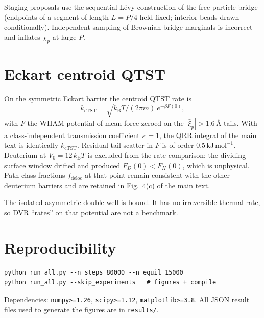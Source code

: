\documentclass[12pt]{article}
\newcommand{\chip}{\chi_p}
\begin{document}
Staging proposals use the sequential L\'evy construction of the free-particle bridge (endpoints of a segment of length $L=P/4$ held fixed; interior beads drawn conditionally). Independent sampling of Brownian-bridge marginals is incorrect and inflates $\chip$ at large $P$.

\section{Eckart centroid QTST}

On the symmetric Eckart barrier the centroid QTST rate is
\[
  k_{\mathrm{cTST}}=\sqrt{k_{\mathrm{B}}T/(2\pi m)}\,e^{-\beta F(0)},
\]
with $F$ the WHAM potential of mean force zeroed on the $|\bar\xi_p|>1.6\,\text{\AA}$ tails. With a class-independent transmission coefficient $\kappa=1$, the QRR integral of the main text is identically $k_{\mathrm{cTST}}$. Residual tail scatter in $F$ is of order $0.5\,\mathrm{kJ\,mol}^{-1}$. Deuterium at $V_0=12\,k_{\mathrm{B}}T$ is excluded from the rate comparison: the dividing-surface window drifted and produced $F_D(0)<F_H(0)$, which is unphysical. Path-class fractions $f_{\mathrm{deloc}}$ at that point remain consistent with the other deuterium barriers and are retained in Fig.~4(c) of the main text.

The isolated asymmetric double well is bound. It has no irreversible thermal rate, so DVR ``rates'' on that potential are not a benchmark.

\section{Reproducibility}

\begin{verbatim}
python run_all.py --n_steps 80000 --n_equil 15000
python run_all.py --skip_experiments   # figures + compile
\end{verbatim}
Dependencies: \texttt{numpy>=1.26}, \texttt{scipy>=1.12}, \texttt{matplotlib>=3.8}.
All JSON result files used to generate the figures are in \texttt{results/}.



\end{document}
